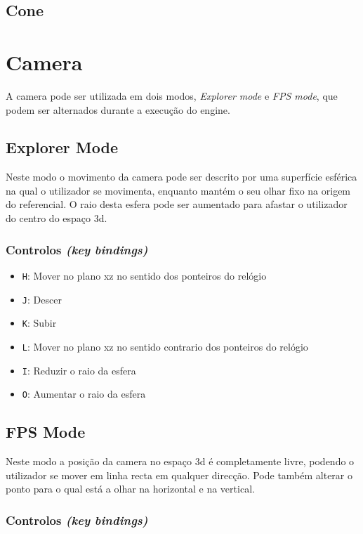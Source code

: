 \documentclass[a4paper]{article}
\begin{document}
\subsection{Cone}

\section{Camera}
A camera pode ser utilizada em dois modos, \textit{Explorer mode} e \textit{FPS mode}, que podem ser alternados durante a execução do engine.

\subsection{Explorer Mode}

Neste modo o movimento da camera pode ser descrito por uma superfície esférica na qual o utilizador se movimenta, enquanto mantém o seu olhar fixo na origem do referencial. O raio desta esfera pode ser aumentado para afastar o utilizador do centro do espaço 3d.

\subsubsection{Controlos \textit{(key bindings)}}

\begin{itemize}
    \item \texttt{H}: Mover no plano xz no sentido dos ponteiros do relógio
    \item \texttt{J}: Descer
    \item \texttt{K}: Subir
    \item \texttt{L}: Mover no plano xz no sentido contrario dos ponteiros do relógio
    \item \texttt{I}: Reduzir o raio da esfera
    \item \texttt{O}: Aumentar o raio da esfera
\end{itemize}

\subsection{FPS Mode}

Neste modo a posição da camera no espaço 3d é completamente livre, podendo o utilizador se mover em linha recta em qualquer direcção. Pode também alterar o ponto para o qual está a olhar na horizontal e na vertical.

\subsubsection{Controlos \textit{(key bindings)}}
\end{document}
